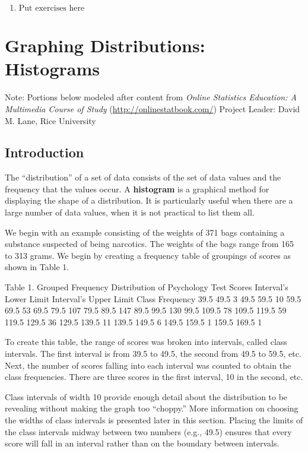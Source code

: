 \documentclass[
]{book}
\providecommand{\tightlist}{%
  \setlength{\itemsep}{0pt}\setlength{\parskip}{0pt}}
\begin{document}
\begin{enumerate}
\def\labelenumi{\arabic{enumi}.}
\tightlist
\item
  \(\text{Put exercises here}\)
\end{enumerate}

\hypertarget{graphing-distributions-histograms}{%
\chapter{Graphing Distributions: Histograms}\label{graphing-distributions-histograms}}

Note: Portions below modeled after content from
\emph{Online Statistics Education: A Multimedia Course of Study}
(\url{http://onlinestatbook.com/}) Project Leader: David M. Lane, Rice University

\hypertarget{introduction-1}{%
\section{Introduction}\label{introduction-1}}

The ``distribution'' of a set of data consists of the set of data values and the
frequency that the values occur.
A \textbf{histogram} is a graphical method for displaying the shape of a distribution.
It is particularly useful when there are a large number of data values, when
it is not practical to list them all.

We begin with an example consisting of the weights of 371 bags containing a
substance suspected of being narcotics. The weights of the bags range from
165 to 313 grams. We begin by creating a frequency table of groupings of scores
as shown in Table 1.

Table 1. Grouped Frequency Distribution of Psychology Test Scores
Interval's Lower Limit Interval's Upper Limit Class Frequency
39.5 49.5 3
49.5 59.5 10
59.5 69.5 53
69.5 79.5 107
79.5 89.5 147
89.5 99.5 130
99.5 109.5 78
109.5 119.5 59
119.5 129.5 36
129.5 139.5 11
139.5 149.5 6
149.5 159.5 1
159.5 169.5 1

To create this table, the range of scores was broken into intervals, called class intervals. The first interval is from 39.5 to 49.5, the second from 49.5 to 59.5, etc. Next, the number of scores falling into each interval was counted to obtain the class frequencies. There are three scores in the first interval, 10 in the second, etc.

Class intervals of width 10 provide enough detail about the distribution to be revealing without making the graph too ``choppy.'' More information on choosing the widths of class intervals is presented later in this section. Placing the limits of the class intervals midway between two numbers (e.g., 49.5) ensures that every score will fall in an interval rather than on the boundary between intervals.
\end{document}
